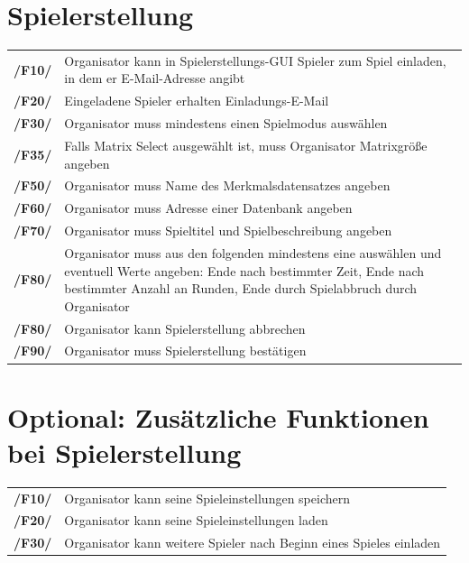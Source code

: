\documentclass[a4paper]{scrreprt}
\begin{document}
    \section{Spielerstellung}
    \begin{tabularx}{\linewidth}{@{}>{\bfseries}l@{\hspace{.5em}}X@{}} 
    /F10/ & \Gls{Organisator} kann in Spielerstellungs-GUI \Gls{Spieler} zum Spiel einladen, in dem er E-Mail-Adresse angibt \\
    /F20/ & Eingeladene \Gls{Spieler} erhalten Einladungs-E-Mail \\
    /F30/ & \Gls{Organisator} muss mindestens einen \Gls{Spielmodus} auswählen\\
    /F35/ & Falls Matrix Select ausgewählt ist, muss \Gls{Organisator} Matrixgröße angeben \\
    /F50/ & \Gls{Organisator} muss Name des Merkmalsdatensatzes angeben \\
    /F60/ & \Gls{Organisator} muss Adresse einer Datenbank angeben \\ %
    /F70/ & \Gls{Organisator} muss Spieltitel und Spielbeschreibung angeben \\ %
    /F80/ & \Gls{Organisator} muss aus den folgenden mindestens eine auswählen und eventuell Werte angeben: Ende nach bestimmter Zeit, Ende nach bestimmter Anzahl an Runden, Ende durch Spielabbruch durch Organisator \\
    /F80/ & \Gls{Organisator} kann Spielerstellung abbrechen \\
    /F90/ & \Gls{Organisator} muss Spielerstellung bestätigen \\
    \end{tabularx}
    
    \section{Optional: Zusätzliche Funktionen bei Spielerstellung}
    \begin{tabularx}{\linewidth}{@{}>{\bfseries}l@{\hspace{.5em}}X@{}} %
    /F10/ & \Gls{Organisator} kann seine \Gls{Spieleinstellungen} speichern \\
    /F20/ & \Gls{Organisator} kann seine \Gls{Spieleinstellungen} laden \\
    /F30/ & \Gls{Organisator} kann weitere \Gls{Spieler} nach Beginn eines Spieles einladen \\
	\end{tabularx}
    
\end{document}
